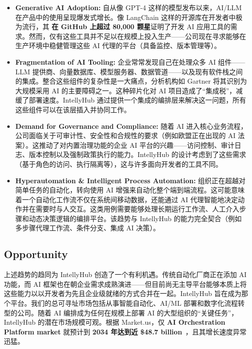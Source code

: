 \documentclass[11pt, a4paper, oneside]{article}
\begin{document}
\begin{itemize}
    \item \textbf{Generative AI Adoption:} 自从像 GPT-4 这样的模型发布以来，AI/LLM 在产品中的使用呈现爆发式增长。像 LangChain 这样的开源库在开发者中极为流行，其 \textbf{在 GitHub 上超过 80,000 颗星}证明了开发 AI 应用工具的需求。然而，仅有这些工具并不足以在规模上投入生产——公司现在寻求能够在生产环境中稳健管理这些 AI 代理的平台（具备监控、版本管理等）。 
    
    \item \textbf{Fragmentation of AI Tooling:} 企业常常发现自己在处理众多 AI 组件——LLM 提供商、向量数据库、模型服务器、数据管道——以及现有软件栈之间的集成。整合这些组件的复杂性是一大痛点，分析机构如 Gartner 将其识别为大规模采用 AI 的主要障碍之一\cite{gartnerAIBarriers}。这种碎片化对 AI 项目造成了“集成税”，减缓了部署速度。IntellyHub 通过提供一个集成的编排层来解决这一问题，所有这些组件可以在该层插入并协同工作。
    
    \item \textbf{Demand for Governance and Compliance:} 随着 AI 进入核心业务流程，公司面临关于可审计性、安全性和合规性的要求（例如欧盟正在出现的 AI 法案\cite{euAIAct}）。这推动了对内置治理功能的企业 AI 平台的兴趣——访问控制、审计日志、版本控制以及强制政策执行的能力。IntellyHub 的设计考虑到了这些需求（基于角色的访问、执行隔离等），这与许多面向开发者的工具不同。
    
    \item \textbf{Hyperautomation \& Intelligent Process Automation:} 组织正在超越对简单任务的自动化，转向使用 AI 增强来自动化整个端到端流程。这可能意味着一个自动化工作流不仅在系统间移动数据，还能通过 AI 代理智能地决定动作并在需要时与人交互。这类用例需要能够处理长期运行工作流、人工介入步骤和动态决策逻辑的编排平台。该趋势与 IntellyHub 的能力完全契合（例如多步骤代理工作流、条件分支、集成 AI 决策）。
\end{itemize}

\subsection{Opportunity}
上述趋势的趋同为 IntellyHub 创造了一个有利机遇。传统自动化厂商正在添加 AI 功能，而 AI 框架也在朝企业需求成熟演进——但目前尚无主导平台能够本质上将这些能力以以开发者为先且企业级就绪的方式合并在一起。IntellyHub 旨在成为那个平台。我们的总可寻址市场包括从事智能自动化、AI/ML 部署和数字化流程转型的公司。随着 AI 编排成为任何在规模上部署 AI 的大型组织的“关键任务”，IntellyHub 的潜在市场规模可观。根据 Market.us，仅 \textbf{AI Orchestration Platform market} 就预计到 \textbf{2034 年达到近 \$48.7 billion}~\cite{AIOrch}，且其增长速度异常迅猛。
\end{document}
